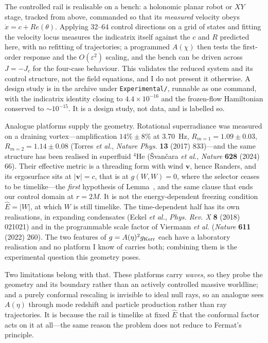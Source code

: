 \documentclass[11pt]{article}
\begin{document}
The controlled rail is realisable on a bench: a holonomic planar robot or $XY$ stage,
tracked from above, commanded so that its \emph{measured} velocity obeys
$\dot x=c+Re(\theta)$. Applying 32--64 control directions on a grid of states and
fitting the velocity locus measures the indicatrix itself against the $c$ and $R$
predicted here, with no refitting of trajectories; a programmed $A(\chi)$ then tests
the first-order response and the $O(\varepsilon^2)$ scaling, and the bench can be
driven across $J=-J_c$ for the four-case behaviour. This validates the reduced system
and its control structure, not the field equations, and I do not present it
otherwise. A design study is in the archive under \texttt{Experimental/}, runnable as
one command, with the indicatrix identity closing to $4.4\times10^{-16}$ and the
frozen-flow Hamiltonian conserved to $\sim10^{-15}$. It is a design study, not data,
and is labelled so.

Analogue platforms supply the geometry. Rotational superradiance was measured on a
draining vortex---amplification $14\%\pm8\%$ at 3.70~Hz, $R_{m=1}=1.09\pm0.03$,
$R_{m=2}=1.14\pm0.08$ (Torres \emph{et al.}, \emph{Nature Phys.} \textbf{13} (2017)
833)---and the same structure has been realised in superfluid $^4$He
(\v{S}van\v{c}ara \emph{et al.}, \emph{Nature} \textbf{628} (2024) 66). Their
effective metric is a threading form with wind $\boldsymbol v$, hence Randers, and its
ergosurface sits at $|\boldsymbol v|=c$, that is at $g(W,W)=0$, where the selector
ceases to be timelike---the \emph{first} hypothesis of Lemma~\msLemCompact, and the
same clause that ends our control domain at $r=2M$. It is not the energy-dependent
freezing condition $\hat E=|W|$, at which $W$ is still timelike. The time-dependent
half has its own realisations, in expanding condensates (Eckel \emph{et al.},
\emph{Phys. Rev. X} \textbf{8} (2018) 021021) and in the programmable scale factor of
Viermann \emph{et al.} (\emph{Nature} \textbf{611} (2022) 260). The two features of
$g=A(\eta)^2g_{\rm Kerr}$ each have a laboratory realisation and no platform I know
of carries both; combining them is the experimental question this geometry poses.

Two limitations belong with that. These platforms carry \emph{waves}, so they probe
the geometry and its boundary rather than an actively controlled massive worldline;
and a purely conformal rescaling is invisible to ideal null rays, so an analogue sees
$A(\eta)$ through mode redshift and particle production rather than ray trajectories.
It is because the rail is timelike at fixed $\hat E$ that the conformal factor acts
on it at all---the same reason the problem does not reduce to Fermat's principle.
\end{document}
